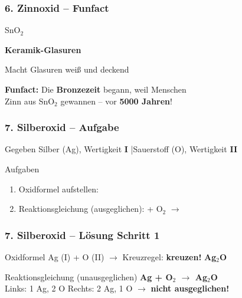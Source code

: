 \documentclass[aspectratio=169, 12pt]{beamer}
\newcommand{\lsg}[1]{\textcolor{loesung}{\textbf{#1}}}
\newcommand{\luecke}{\underline{\hspace{2.5cm}}}
\begin{document}
\begin{frame}
\frametitle{6. Zinnoxid – Funfact}
\begin{center}
\vspace{0.3cm}
{\Huge \textcolor{chemie}{SnO$_2$}}
\vspace{0.8cm}

{\Large\textbf{Keramik-Glasuren}}
\vspace{0.5cm}

Macht Glasuren weiß und deckend
\vspace{0.8cm}

\textcolor{akzent}{\textbf{Funfact:}} Die \textbf{Bronzezeit} begann, weil Menschen\\
Zinn aus SnO$_2$ gewannen – vor \textbf{5000 Jahren}!
\end{center}
\end{frame}


\begin{frame}
\frametitle{7. Silberoxid – Aufgabe}
\begin{block}{Gegeben}
Silber (Ag), Wertigkeit \textbf{I} \quad|\quad Sauerstoff (O), Wertigkeit \textbf{II}
\end{block}
\vspace{0.5cm}
\begin{block}{Aufgaben}
\begin{enumerate}
\item Oxidformel aufstellen: \luecke
\item Reaktionsgleichung (ausgeglichen): \quad \luecke{} + O$_2$ $\rightarrow$ \luecke
\end{enumerate}
\end{block}
\end{frame}

\begin{frame}
\frametitle{7. Silberoxid – Lösung Schritt 1}
\begin{block}{Oxidformel}
Ag (I) + O (II) $\rightarrow$ Kreuzregel: \textbf{kreuzen!} \hfill \lsg{Ag$_2$O}
\end{block}
\vspace{0.3cm}
\begin{block}{Reaktionsgleichung (unausgeglichen)}
\lsg{Ag + O$_2$ $\rightarrow$ Ag$_2$O}\\[0.3cm]
Links: 1 Ag, 2 O \quad Rechts: 2 Ag, 1 O \quad $\rightarrow$ \textbf{nicht ausgeglichen!}
\end{block}
\end{frame}
\end{document}
